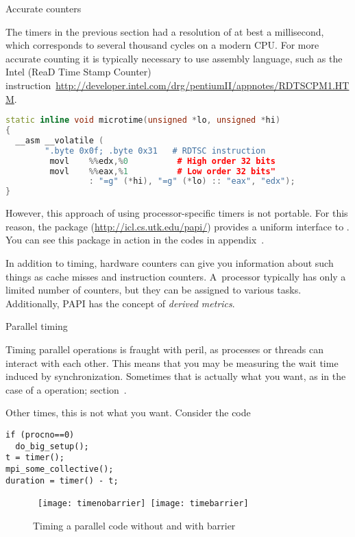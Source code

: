 
 {Accurate counters}

The timers in the previous section had a resolution of at best a
millisecond, which corresponds to several thousand cycles on a modern
CPU. For more accurate counting it is typically necessary to use
assembly language, such as the Intel  (ReaD Time Stamp
Counter)
instruction~\url{http://developer.intel.com/drg/pentiumII/appnotes/RDTSCPM1.HTM}.
\begin{lstlisting}[language=c++]
static inline void microtime(unsigned *lo, unsigned *hi)
{
  __asm __volatile (
        ".byte 0x0f; .byte 0x31   # RDTSC instruction
         movl    %%edx,%0          # High order 32 bits
         movl    %%eax,%1          # Low order 32 bits"
                 : "=g" (*hi), "=g" (*lo) :: "eax", "edx");
}                                                
\end{lstlisting}
However,
this approach of using processor-specific timers is not portable. For
this reason, the  package (\url{http://icl.cs.utk.edu/papi/})
provides a uniform interface to .
You can see this package in action in the codes in
appendix~.

In addition to timing, hardware counters can give you information about 
such things as cache misses and instruction counters. A~processor typically
has only a limited number of counters, but they can be assigned to various tasks.
Additionally, PAPI has the concept of \emph{derived metrics}.

 {Parallel timing}

Timing parallel operations is fraught with peril,
as processes or threads can interact with each other.
This means that you may be measuring the wait time
induced by synchronization.
Sometimes that is actually what you want,
as in the case of a  operation;
section~.

Other times, this is not what you want.
Consider the code
\begin{lstlisting}
if (procno==0)
  do_big_setup();
t = timer();
mpi_some_collective();
duration = timer() - t;
\end{lstlisting}

\begin{figure}[ht]
  \hbox\bgroup
  \texttt{[image: timenobarrier]}
  \texttt{[image: timebarrier]}
  \egroup
  \caption{Timing a parallel code without and with barrier}
  \label{fig:time-collective}
\end{figure}

